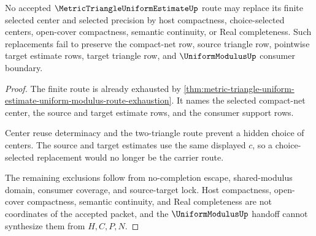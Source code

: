 \begin{theorem}
\label{thm:metric-triangle-uniform-estimate-choice-refusal}
No accepted $\MetricTriangleUniformEstimateUp$ route may replace its finite selected center and selected precision by host compactness, choice-selected centers, open-cover compactness, semantic continuity, or Real completeness. Such replacements fail to preserve the compact-net row, source triangle row, pointwise target estimate rows, target triangle row, and $\UniformModulusUp$ consumer boundary.
\end{theorem}
\begin{proof}
The finite route is already exhausted by \autoref{thm:metric-triangle-uniform-estimate-uniform-modulus-route-exhaustion}. It names the selected compact-net center, the source and target estimate rows, and the consumer support rows.

Center reuse determinacy and the two-triangle route prevent a hidden choice of centers. The source and target estimates use the same displayed $c$, so a choice-selected replacement would no longer be the carrier route.

The remaining exclusions follow from no-completion escape, shared-modulus domain, consumer coverage, and source-target lock. Host compactness, open-cover compactness, semantic continuity, and Real completeness are not coordinates of the accepted packet, and the $\UniformModulusUp$ handoff cannot synthesize them from $H,C,P,N$.
\end{proof}

